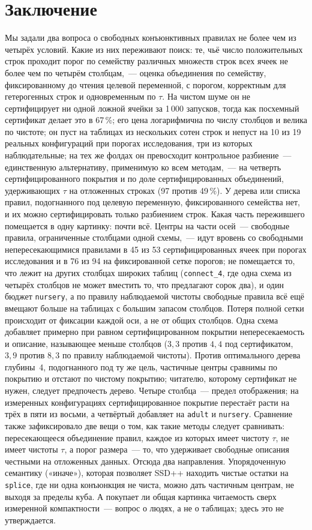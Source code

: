 \documentclass[11pt]{article}
\begin{document}
\section{Заключение}
Мы задали два вопроса о свободных конъюнктивных правилах не более чем из четырёх условий. Какие из них переживают поиск: те, чьё число положительных строк проходит порог по семейству различных множеств строк всех ячеек не более чем по четырём столбцам,~--- оценка объединения по семейству, фиксированному до чтения целевой переменной, с порогом, корректным для гетерогенных строк и одновременным по $\tau$. На чистом шуме он не сертифицирует ни одной ложной ячейки за 1\,000 запусков, тогда как посхемный сертификат делает это в 67\,\%; его цена логарифмична по числу столбцов и велика по чистоте; он пуст на таблицах из нескольких сотен строк и непуст на 10 из 19 реальных конфигураций при порогах исследования, три из которых наблюдательные; на тех же фолдах он превосходит контрольное разбиение~--- единственную альтернативу, применимую ко всем методам,~--- на четверть сертифицированного покрытия и по доле сертифицированных объединений, удерживающих $\tau$ на отложенных строках (97 против 49\,\%). У дерева или списка правил, подогнанного под целевую переменную, фиксированного семейства нет, и их можно сертифицировать только разбиением строк. Какая часть пережившего помещается в одну картинку: почти всё. Центры на части осей~--- свободные правила, ограниченные столбцами одной схемы,~--- идут вровень со свободными непересекающимися правилами в 45 из 53 сертифицированных ячеек при порогах исследования и в 76 из 94 на фиксированной сетке порогов; не помещается то, что лежит на других столбцах широких таблиц (\texttt{connect\_4}, где одна схема из четырёх столбцов не может вместить то, что предлагают сорок два), и один бюджет \texttt{nursery}, а по правилу наблюдаемой чистоты свободные правила всё ещё вмещают больше на таблицах с большим запасом столбцов. Потеря полной сетки происходит от фиксации каждой оси, а не от общих столбцов. Одна схема добавляет примерно при равном сертифицированном покрытии непересекаемость и описание, называющее меньше столбцов ($3{,}3$ против $4{,}4$ под сертификатом, $3{,}9$ против $8{,}3$ по правилу наблюдаемой чистоты). Против оптимального дерева глубины~4, подогнанного под ту же цель, частичные центры сравнимы по покрытию и отстают по чистому покрытию; читателю, которому сертификат не нужен, следует предпочесть дерево. Четыре столбца~--- предел отображения; на измеренных конфигурациях сертифицированное покрытие перестаёт расти на трёх в пяти из восьми, а четвёртый добавляет на \texttt{adult} и \texttt{nursery}. Сравнение также зафиксировало две вещи о том, как такие методы следует сравнивать: пересекающееся объединение правил, каждое из которых имеет чистоту $\tau$, не имеет чистоты $\tau$, а порог размера~--- то, что удерживает свободные описания честными на отложенных данных. Отсюда два направления. Упорядоченную семантику («иначе»), которая позволяет SSD++ находить чистые остатки на \texttt{splice}, где ни одна конъюнкция не чиста, можно дать частичным центрам, не выходя за пределы куба. А покупает ли общая картинка читаемость сверх измеренной компактности~--- вопрос о людях, а не о таблицах; здесь это не утверждается.
\end{document}
